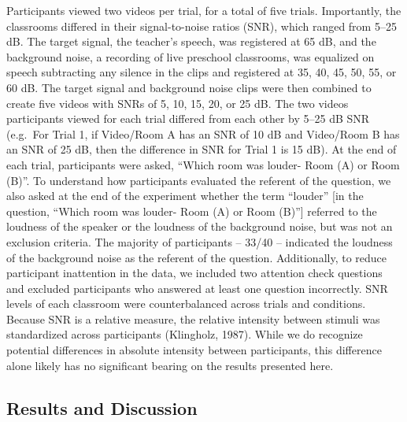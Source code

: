 \documentclass[10pt, letterpaper]{article}
\begin{document}
Participants viewed two videos per trial, for a total of five trials.
Importantly, the classrooms differed in their signal-to-noise ratios
(SNR), which ranged from 5--25 dB. The target signal, the teacher's
speech, was registered at 65 dB, and the background noise, a recording
of live preschool classrooms, was equalized on speech subtracting any
silence in the clips and registered at 35, 40, 45, 50, 55, or 60 dB. The
target signal and background noise clips were then combined to create
five videos with SNRs of 5, 10, 15, 20, or 25 dB. The two videos
participants viewed for each trial differed from each other by 5--25 dB
SNR (e.g.~For Trial 1, if Video/Room A has an SNR of 10 dB and
Video/Room B has an SNR of 25 dB, then the difference in SNR for Trial 1
is 15 dB). At the end of each trial, participants were asked, ``Which
room was louder- Room (A) or Room (B)''. To understand how participants
evaluated the referent of the question, we also asked at the end of the
experiment whether the term ``louder'' {[}in the question, ``Which room
was louder- Room (A) or Room (B)''{]} referred to the loudness of the
speaker or the loudness of the background noise, but was not an
exclusion criteria. The majority of participants -- 33/40 -- indicated
the loudness of the background noise as the referent of the question.
Additionally, to reduce participant inattention in the data, we included
two attention check questions and excluded participants who answered at
least one question incorrectly. SNR levels of each classroom were
counterbalanced across trials and conditions. Because SNR is a relative
measure, the relative intensity between stimuli was standardized across
participants (Klingholz, 1987). While we do recognize potential
differences in absolute intensity between participants, this difference
alone likely has no significant bearing on the results presented here.

\hypertarget{results-and-discussion}{%
\subsection{Results and Discussion}\label{results-and-discussion}}
\end{document}
